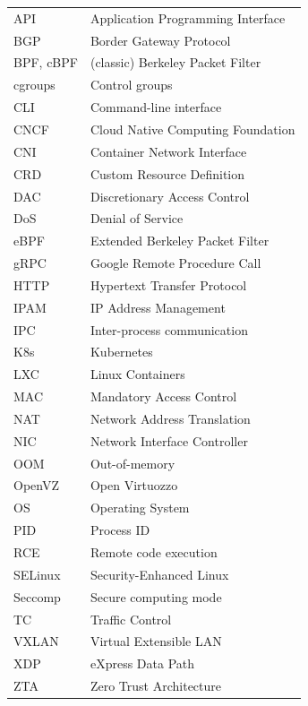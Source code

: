 \documentclass[english, 12pt, a4paper, sci, utf8, a-2b, online]{aaltothesis}
\begin{document}
\begin{tabular}{ll}
  API         & Application Programming Interface   \\
  BGP         & Border Gateway Protocol             \\
  BPF, cBPF   & (classic) Berkeley Packet Filter    \\
  cgroups     & Control groups                      \\
  CLI         & Command-line interface              \\
  CNCF        & Cloud Native Computing Foundation   \\
  CNI         & Container Network Interface         \\
  CRD         & Custom Resource Definition          \\
  DAC         & Discretionary Access Control        \\
  DoS         & Denial of Service                   \\
  eBPF        & Extended Berkeley Packet Filter     \\
  gRPC        & Google Remote Procedure Call        \\
  HTTP        & Hypertext Transfer Protocol         \\
  IPAM        & IP Address Management               \\
  IPC         & Inter-process communication         \\
  K8s         & Kubernetes                          \\
  LXC         & Linux Containers                    \\
  MAC         & Mandatory Access Control            \\
  NAT         & Network Address Translation         \\
  NIC         & Network Interface Controller        \\
  OOM         & Out-of-memory                       \\
  OpenVZ      & Open Virtuozzo                      \\
  OS          & Operating System                    \\
  PID         & Process ID                          \\
  RCE         & Remote code execution               \\
  SELinux     & Security-Enhanced Linux             \\
  Seccomp     & Secure computing mode               \\
  TC          & Traffic Control                     \\
  VXLAN       & Virtual Extensible LAN              \\
  XDP         & eXpress Data Path                   \\
  ZTA         & Zero Trust Architecture             \\
\end{tabular}
\end{document}
